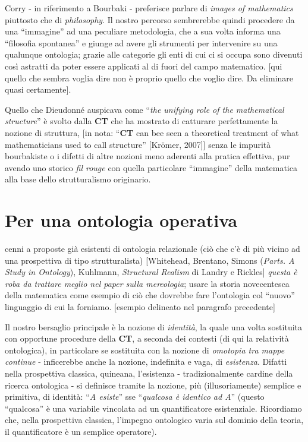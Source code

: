 \documentclass[a4paper, 11pt]{article}
\begin{document}
Corry - in riferimento a Bourbaki - preferisce parlare di \textit{images of mathematics} piuttosto che di \textit{philosophy}. Il nostro percorso sembrerebbe quindi procedere da una ``immagine'' ad una peculiare metodologia, che a sua volta informa una ``filosofia spontanea'' e giunge ad avere gli strumenti per intervenire su una qualunque ontologia; grazie alle categorie gli enti di cui ci si occupa sono divenuti così astratti da poter essere applicati al di fuori del campo matematico. [qui quello che sembra voglia dire non è proprio quello che voglio dire. Da eliminare quasi certamente].

Quello che Dieudonné auspicava come ``\textit{the unifying role of the mathematical structure}'' è svolto dalla \textbf{CT} che ha mostrato di catturare perfettamente la nozione di struttura, [in nota: ``\textbf{CT} can bee seen a theoretical treatment of what mathematicians used to call structure'' [Kr\"omer, 2007]] senza le impurità bourbakiste o i difetti di altre nozioni meno aderenti alla pratica effettiva, pur avendo uno storico \textit{fil rouge} con quella particolare ``immagine'' della matematica alla base dello strutturalismo originario.
\endfo
\section{Per una ontologia operativa}
cenni a proposte già esistenti di ontologia relazionale (ciò che c'è di più vicino ad una prospettiva di tipo strutturalista) [Whitehead, Brentano, Simons (\textit{Parts. A Study in Ontology}), Kuhlmann, \textit{Structural Realism} di Landry e Rickles] \textit{questa è roba da trattare meglio nel paper sulla mereologia}; usare la storia novecentesca della matematica come esempio di ciò che dovrebbe fare l'ontologia col ``nuovo'' linguaggio di cui la forniamo. [esempio delineato nel paragrafo precedente]


Il nostro bersaglio principale è la nozione di \textit{identità}, la quale  una volta sostituita con opportune procedure della \textbf{CT}, a seconda dei contesti (di qui la relatività ontologica), in particolare se sostituita con la nozione di \textit{omotopia tra mappe continue} - inficerebbe anche la nozione, indefinita e vaga, di \textit{esistenza}. Difatti nella prospettiva classica, quineana, l'esistenza - tradizionalmente cardine della ricerca ontologica - si definisce tramite la nozione, più (illusoriamente) semplice e primitiva, di identità: ``\textit{A esiste}'' sse ``\textit{qualcosa è identico ad A}'' (questo ``qualcosa'' è una variabile vincolata ad un quantificatore esistenziale. Ricordiamo che, nella prospettiva classica, l'impegno ontologico varia sul dominio della teoria, il quantificatore è un semplice operatore).
\end{document}
